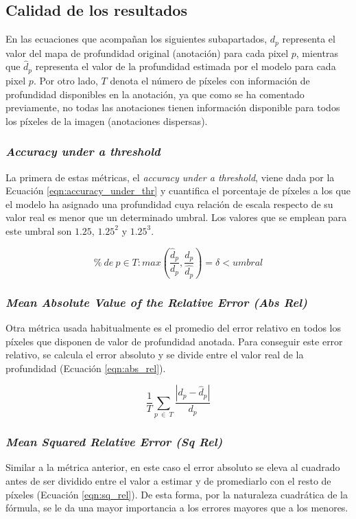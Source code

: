 \documentclass[a4paper]{article}
\begin{document}
\subsection{Calidad de los resultados}
En las ecuaciones que acompañan los siguientes subapartados, $d_p$ representa el valor del mapa de profundidad original (anotación) para cada pixel $p$, mientras que $\hat{d}_p$ representa el valor de la profundidad estimada por el modelo para cada pixel $p$. Por otro lado, $T$ denota el número de píxeles con información de profundidad disponibles en la anotación, ya que como se ha comentado previamente,  no todas las anotaciones tienen información disponible para todos los píxeles de la imagen (anotaciones dispersas).

\subsubsection{\textit{Accuracy under a threshold}}
La primera de estas métricas, el \textit{accuracy under a threshold}, viene dada por la Ecuación \ref{eqn:accuracy_under_thr} y cuantifica el porcentaje de píxeles a los que el modelo ha asignado una profundidad cuya relación de escala respecto de su valor real es menor que un determinado umbral. Los valores que se emplean para este umbral son $1.25$, $1.25^2$ y $1.25^3$.

\begin{equation}
\label{eqn:accuracy_under_thr}
\% \ de \ p \in T : max(\frac{\hat{d}_p}{d_p},\frac{d_p}{\hat{d_p}}) = \delta < umbral 
\end{equation}

\subsubsection{\textit{Mean Absolute Value of the Relative Error (Abs Rel)}}
Otra métrica usada habitualmente es el promedio del error relativo en todos los píxeles que disponen de valor de profundidad anotada. Para conseguir este error relativo, se calcula el error absoluto y se divide entre el valor real de la profundidad (Ecuación \ref{eqn:abs_rel}).

\begin{equation}
\label{eqn:abs_rel}
\frac{1}{T}\sum_{p\ \in\ T} \frac{|d_p - \hat{d}_p|}{d_p}
\end{equation}

\subsubsection{\textit{Mean Squared Relative Error (Sq Rel)}}
Similar a la métrica anterior, en este caso el error absoluto se eleva al cuadrado antes de ser dividido entre el valor a estimar y de promediarlo con el resto de píxeles (Ecuación \ref{eqn:sq_rel}). De esta forma, por la naturaleza cuadrática de la fórmula, se le da una mayor importancia a los errores mayores que a los menores.
\end{document}

